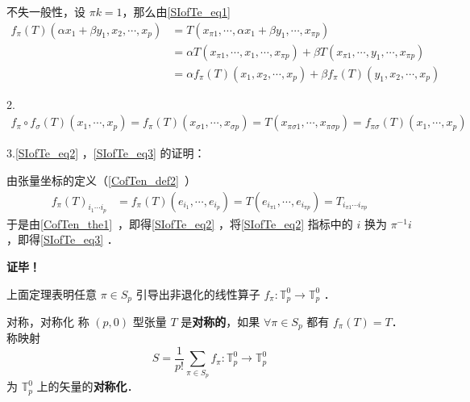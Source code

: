 不失一般性，设 $\pi k=1$，那么由\autoref{SIofTe_eq1} 
\begin{equation}
\begin{aligned}
f_\pi(T)(\alpha x_1+\beta y_1,x_2,\cdots,x_p)&=T(x_{\pi1},\cdots,\alpha x_1+\beta y_1,\cdots,x_{\pi p})\\
&=\alpha T(x_{\pi1},\cdots,x_1,\cdots,x_{\pi p})+\beta T(x_{\pi1},\cdots,y_1,\cdots,x_{\pi p})\\
&=\alpha f_{\pi}(T)(x_1,x_2,\cdots,x_p)+\beta f_{\pi}(T)(y_1,x_2,\cdots,x_p)
\end{aligned}
\end{equation}

2.\begin{equation}
\begin{aligned}
f_\pi\circ f_\sigma(T)(x_1,\cdots,x_p)=f_\pi(T)(x_{\sigma1},\cdots,x_{\sigma p})=T(x_{\pi\sigma1},\cdots,x_{\pi\sigma p})=f_{\pi\sigma}(T)(x_1,\cdots,x_p)
\end{aligned}
\end{equation}


3.\autoref{SIofTe_eq2} ，\autoref{SIofTe_eq3} 的证明：

由张量坐标的定义（\autoref{CofTen_def2}~）
\begin{equation}
\begin{aligned}
f_{\pi}(T)_{i_1\cdots i_p}&=f_{\pi}(T)(e_{i_1},\cdots,e_{i_p})=T(e_{i_{\pi1}},\cdots,e_{i_{\pi p}})=T_{i_{\pi1}\cdots i_{\pi p}}
\end{aligned}
\end{equation}
于是由\autoref{CofTen_the1}~，即得\autoref{SIofTe_eq2} ，将\autoref{SIofTe_eq2} 指标中的 $i$ 换为  $\pi^{-1} i$，即得\autoref{SIofTe_eq3} ．

\textbf{证毕！}

上面定理表明任意 $\pi \in S_p$ 引导出非退化的线性算子 $f_\pi:\mathbb{T}_p^0\rightarrow\mathbb{T}_p^0$ ．

\begin{definition}{对称，对称化}
称 $(p,0)$ 型张量 $T$ 是\textbf{对称的}，如果 $\forall \pi\in S_p$ 都有 $f_{\pi}(T)=T$．称映射 
\begin{equation}
S=\frac{1}{p!}\sum_{\pi\in S_p} f_\pi:\mathbb{T}_p^0\rightarrow\mathbb{T}_p^0
\end{equation}
为 $\mathbb{T}_p^0$ 上的矢量的\textbf{对称化}．
\end{definition}

